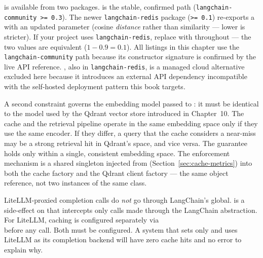 \begin{notebox}
 is available from two packages.
 is the stable,
confirmed path (\texttt{langchain-community >= 0.3}). The newer
\texttt{langchain-redis} package (\texttt{>= 0.1}) re-exports a
 with an updated 
parameter (cosine \emph{distance} rather than similarity --- lower is
stricter). If your project uses \texttt{langchain-redis}, replace
 with 
throughout --- the two values are equivalent (\(1 - 0.9 = 0.1\)).
All listings in this chapter use the \texttt{langchain-community} path
because its constructor signature is confirmed by the live API reference.
, also in \texttt{langchain-redis}, is a
managed cloud alternative excluded here because it introduces an external
API dependency incompatible with the self-hosted deployment pattern this
book targets.
\end{notebox}

A second constraint governs the embedding model passed to
: it must be identical to the model used by the
Qdrant vector store introduced in Chapter~10. The cache and the retrieval
pipeline operate in the same embedding space only if they use the same
encoder. If they differ, a query that the cache considers a near-miss may
be a strong retrieval hit in Qdrant's space, and vice versa. The
 guarantee holds only within a single, consistent
embedding space. The enforcement mechanism is a shared 
singleton injected from 
(Section~\ref{sec:cache-metrics}) into both the cache factory and the
Qdrant client factory --- the same object reference, not two instances
of the same class.

\begin{warningbox}
LiteLLM-proxied completion calls do \emph{not} go through LangChain's
 global.  is a
side-effect on  that intercepts only
 calls made through the LangChain abstraction.
For LiteLLM, caching is configured separately via
 \\
 before any  call. Both
must be configured. A system that sets only  and
uses LiteLLM as its completion backend will have zero cache hits and no
error to explain why.
\end{warningbox}

